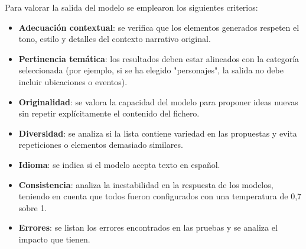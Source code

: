 Para valorar la salida del modelo se emplearon los siguientes criterios:
\begin{itemize}
\item \textbf{Adecuación contextual}: se verifica que los elementos generados respeten el tono, estilo y detalles del contexto narrativo original.
\item \textbf{Pertinencia temática}: los resultados deben estar alineados con la categoría seleccionada
(por ejemplo, si se ha elegido "personajes", la salida no debe incluir ubicaciones o eventos).
\item \textbf{Originalidad}: se valora la capacidad del modelo para proponer ideas nuevas sin repetir explícitamente el contenido del fichero.
\item \textbf{Diversidad}: se analiza si la lista contiene variedad en las propuestas y evita repeticiones o elementos demasiado similares.
\item \textbf{Idioma}: se indica si el modelo acepta texto en español. 
\item \textbf{Consistencia}: analiza la inestabilidad en la respuesta de los modelos,
teniendo en cuenta que todos fueron configurados con una temperatura de 0,7 sobre 1. 
\item \textbf{Errores}: se listan los errores encontrados en las pruebas y se analiza el impacto que tienen.
\end{itemize}